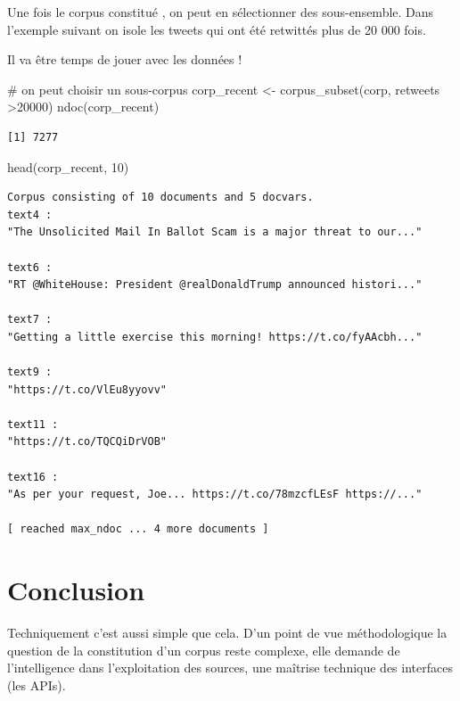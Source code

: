 \documentclass[
  letterpaper,
  DIV=11,
  numbers=noendperiod]{scrreprt}
\newenvironment{Shaded}{\begin{snugshade}}{\end{snugshade}}
\newcommand{\CommentTok}[1]{\textcolor[rgb]{0.37,0.37,0.37}{#1}}
\newcommand{\DecValTok}[1]{\textcolor[rgb]{0.68,0.00,0.00}{#1}}
\newcommand{\FunctionTok}[1]{\textcolor[rgb]{0.28,0.35,0.67}{#1}}
\newcommand{\NormalTok}[1]{\textcolor[rgb]{0.00,0.23,0.31}{#1}}
\newcommand{\OtherTok}[1]{\textcolor[rgb]{0.00,0.23,0.31}{#1}}
\newcommand{\SpecialCharTok}[1]{\textcolor[rgb]{0.37,0.37,0.37}{#1}}
\begin{document}
Une fois le corpus constitué , on peut en sélectionner des
sous-ensemble. Dans l'exemple suivant on isole les tweets qui ont été
retwittés plus de 20 000 fois.

Il va être temps de jouer avec les données !

\begin{Shaded}
\begin{Highlighting}[]
\CommentTok{\# on peut choisir un sous{-}corpus }
\NormalTok{corp\_recent }\OtherTok{\textless{}{-}} \FunctionTok{corpus\_subset}\NormalTok{(corp, retweets }\SpecialCharTok{\textgreater{}}\DecValTok{20000}\NormalTok{)}
\FunctionTok{ndoc}\NormalTok{(corp\_recent)}
\end{Highlighting}
\end{Shaded}

\begin{verbatim}
[1] 7277
\end{verbatim}

\begin{Shaded}
\begin{Highlighting}[]
\FunctionTok{head}\NormalTok{(corp\_recent, }\DecValTok{10}\NormalTok{)}
\end{Highlighting}
\end{Shaded}

\begin{verbatim}
Corpus consisting of 10 documents and 5 docvars.
text4 :
"The Unsolicited Mail In Ballot Scam is a major threat to our..."

text6 :
"RT @WhiteHouse: President @realDonaldTrump announced histori..."

text7 :
"Getting a little exercise this morning! https://t.co/fyAAcbh..."

text9 :
"https://t.co/VlEu8yyovv"

text11 :
"https://t.co/TQCQiDrVOB"

text16 :
"As per your request, Joe... https://t.co/78mzcfLEsF https://..."

[ reached max_ndoc ... 4 more documents ]
\end{verbatim}

\section{Conclusion}\label{conclusion-1}

Techniquement c'est aussi simple que cela. D'un point de vue
méthodologique la question de la constitution d'un corpus reste
complexe, elle demande de l'intelligence dans l'exploitation des
sources, une maîtrise technique des interfaces (les APIs).
\end{document}
